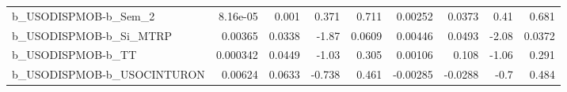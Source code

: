 \begin{tabular}{lrrrrrrrr}
b\_USODISPMOB-b\_Sem\_2       &    8.16e-05 &        0.001 &    0.371 &    0.711 &    0.00252 &      0.0373 &         0.41 &         0.681 \\
b\_USODISPMOB-b\_Si\_MTRP     &     0.00365 &       0.0338 &    -1.87 &   0.0609 &    0.00446 &      0.0493 &        -2.08 &        0.0372 \\
b\_USODISPMOB-b\_TT          &    0.000342 &       0.0449 &    -1.03 &    0.305 &    0.00106 &       0.108 &        -1.06 &         0.291 \\
b\_USODISPMOB-b\_USOCINTURON &     0.00624 &       0.0633 &   -0.738 &    0.461 &   -0.00285 &     -0.0288 &         -0.7 &         0.484 \\
\bottomrule
\end{tabular}
